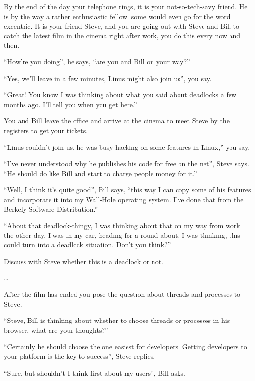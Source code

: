 \documentclass[addpoints,svv]{miunexam}
\begin{document}
\begin{questions}
  \question[3]\label{q:deadlock}
  By the end of the day your telephone rings, it is your not-so-tech-savy 
  friend.
  He is by the way a rather enthusiastic fellow, some would even go for the 
  word excentric.
  It is your friend Steve, and you are going out with Steve and Bill to catch 
  the latest film in the cinema right after work, you do this every now and 
  then.

  ``How're you doing'', he says, ``are you and Bill on your way?''

  ``Yes, we'll leave in a few minutes, Linus might also join us'', you say.

  ``Great!  You know I was thinking about what you said about deadlocks a few 
  months ago.  I'll tell you when you get here.''

  You and Bill leave the office and arrive at the cinema to meet Steve by the 
  registers to get your tickets.

  ``Linus couldn't join us, he was busy hacking on some features in Linux,'' 
  you say.

  ``I've never understood why he publishes his code for free on the net'', 
  Steve says.
  ``He should do like Bill and start to charge people money for it.''

  ``Well, I think it's quite good'', Bill says, ``this way I can copy some of 
  his features and incorporate it into my Wall-Hole operating system.  I've 
  done that from the Berkely Software Distribution.''

  ``About that deadlock-thingy, I was thinking about that on my way from work 
  the other day.  I was in my car, heading for a round-about.
  I was thinking, this could turn into a deadlock situation.  Don't you 
  think?''

  Discuss with Steve whether this is a deadlock or not.
  \begin{solution}
    \dots
  \end{solution}

  \question\label{q:drivers}
  After the film has ended you pose the question about threads and processes to 
  Steve.

  ``Steve, Bill is thinking about whether to choose threads or processes in his 
  browser, what are your thoughts?''

  ``Certainly he should choose the one easiest for developers.
  Getting developers to your platform is the key to success'', Steve replies.

  ``Sure, but shouldn't I think first about my users'', Bill asks.


\end{questions}
\end{document}
